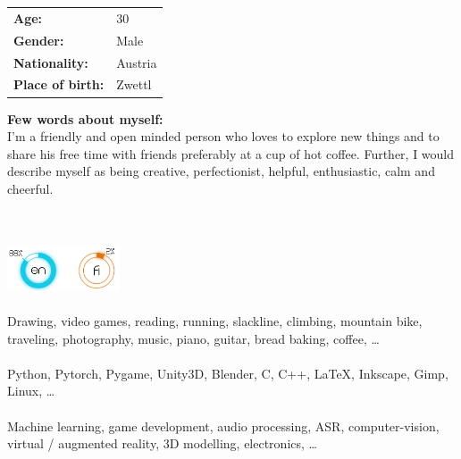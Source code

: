 


\\\\
\begin{tabular} { l p{3.9cm} }
  \textbf{Age:} & 30\\
  \textbf{Gender:} & Male\\
  \textbf{Nationality:} & Austria\\
  \textbf{Place of birth:} & Zwettl\\
\end{tabular}

\textbf{Few words about myself:}\\
I'm a friendly and open minded person who loves to explore new things and to share his free time with friends preferably at a cup of hot coffee.
Further, I would describe myself as being creative, perfectionist, helpful, enthusiastic, calm and cheerful.


\\\\
\begingroup \centering \includegraphics[width=0.25\textwidth]{./figs/languages.jpg} \endgroup\\



\\
Drawing, video games, reading, running, slackline, climbing, mountain bike, traveling, photography, music, piano, guitar, bread baking, coffee, \dots\\



\\
Python, Pytorch, Pygame, Unity3D, Blender, C, C++, \LaTeX, Inkscape, Gimp, Linux, \dots\\



\\
Machine learning, game development, audio processing, ASR, computer-vision, virtual / augmented reality, 3D modelling, electronics, \dots\\